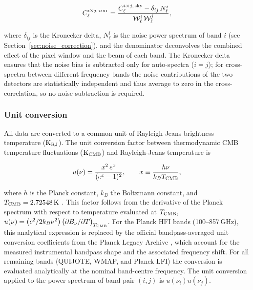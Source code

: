 \begin{equation}
    \label{eq:corrected_cl}
    C_{\ell}^{i \times j,\,\rm corr} = \frac{C_{\ell}^{i \times j,\,\rm sky} - \delta_{ij}\,N_{\ell}^{i}}{\mathcal{W}_\ell^i\,\mathcal{W}_\ell^j},
\end{equation}

where $\delta_{ij}$ is the Kronecker delta, $N_\ell^i$ is the noise power spectrum of band $i$ (see Section~\ref{sec:noise_correction}), and the denominator deconvolves the combined effect of the pixel window and the beam of each band. The Kronecker delta ensures that the noise bias is subtracted only for auto-spectra ($i = j$); for cross-spectra between different frequency bands the noise contributions of the two detectors are statistically independent and thus average to zero in the cross-correlation, so no noise subtraction is required.


\subsubsection{Unit conversion}
\label{sec:unit_conversion}


All data are converted to a common unit of Rayleigh-Jeans brightness temperature ($\mathrm{K}_{\rm RJ}$). The unit conversion factor between thermodynamic CMB temperature fluctuations ($\mathrm{K}_{\rm CMB}$) and Rayleigh-Jeans temperature is

\begin{equation}
    u(\nu) = \frac{x^2\,e^{x}}{(e^{x}-1)^2},
    \qquad x \equiv \frac{h\nu}{k_B T_{\rm CMB}},
    \label{eq:unit_conversion}
\end{equation}

where $h$ is the Planck constant, $k_B$ the Boltzmann constant, and $T_{\rm CMB} = 2.72548\,\mathrm{K}$ \citep{Fixsen_2009}. This factor follows from the derivative of the Planck spectrum with respect to temperature evaluated at $T_{\rm CMB}$, $u(\nu) = \bigl(c^2/2k_B\nu^2\bigr)\,\bigl(\partial B_\nu/\partial T\bigr)_{T_{\rm CMB}}$. For the Planck HFI bands (100--857\,GHz), this analytical expression is replaced by the official bandpass-averaged unit conversion coefficients from the Planck Legacy Archive \citep{Planck_2018III}, which account for the measured instrumental bandpass shape and the associated frequency shift. For all remaining bands (QUIJOTE, WMAP, and Planck LFI) the conversion is evaluated analytically at the nominal band-centre frequency. The unit conversion applied to the power spectrum of band pair $(i,j)$ is $u(\nu_i)u(\nu_j)$.


